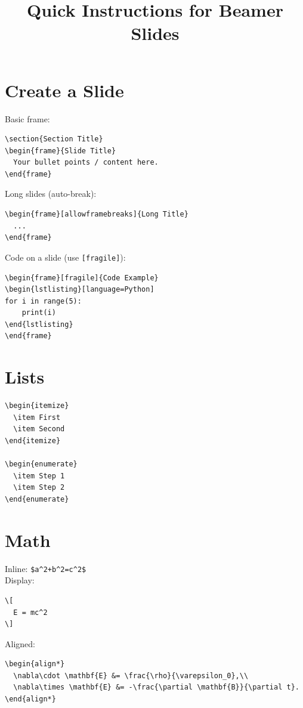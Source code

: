 \documentclass[11pt]{article}
\title{Quick Instructions for Beamer Slides}
\author{}
\date{}
\begin{document}
\maketitle

\section*{Create a Slide}
Basic frame:
\begin{verbatim}
\section{Section Title}
\begin{frame}{Slide Title}
  Your bullet points / content here.
\end{frame}
\end{verbatim}

Long slides (auto-break):
\begin{verbatim}
\begin{frame}[allowframebreaks]{Long Title}
  ...
\end{frame}
\end{verbatim}

Code on a slide (use \texttt{[fragile]}):
\begin{verbatim}
\begin{frame}[fragile]{Code Example}
\begin{lstlisting}[language=Python]
for i in range(5):
    print(i)
\end{lstlisting}
\end{frame}
\end{verbatim}

\section*{Lists}
\begin{verbatim}
\begin{itemize}
  \item First
  \item Second
\end{itemize}

\begin{enumerate}
  \item Step 1
  \item Step 2
\end{enumerate}
\end{verbatim}

\section*{Math}
Inline: \verb|$a^2+b^2=c^2$| \\
Display:
\begin{verbatim}
\[
  E = mc^2
\]
\end{verbatim}
Aligned:
\begin{verbatim}
\begin{align*}
  \nabla\cdot \mathbf{E} &= \frac{\rho}{\varepsilon_0},\\
  \nabla\times \mathbf{E} &= -\frac{\partial \mathbf{B}}{\partial t}.
\end{align*}
\end{verbatim}
\end{document}
